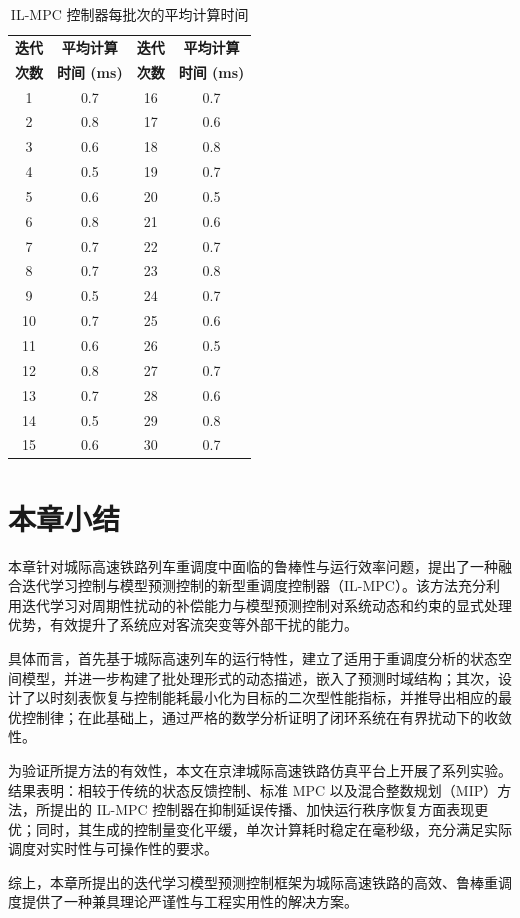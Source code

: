 \begin{table}
\centering
\caption{IL-MPC 控制器每批次的平均计算时间}
\begin{tabular}{@{}c@{\hspace{8pt}}c@{\hspace{12pt}}c@{\hspace{8pt}}c@{}}
\hline
\textbf{迭代} & \textbf{平均计算} & \textbf{迭代} & \textbf{平均计算} \\
\textbf{次数} & \textbf{时间 (ms)} & \textbf{次数} & \textbf{时间 (ms)} \\
\hline
1  & 0.7 & 16 & 0.7 \\
2  & 0.8 & 17 & 0.6 \\
3  & 0.6 & 18 & 0.8 \\
4  & 0.5 & 19 & 0.7 \\
5  & 0.6 & 20 & 0.5 \\
6  & 0.8 & 21 & 0.6 \\
7  & 0.7 & 22 & 0.7 \\
8  & 0.7 & 23 & 0.8 \\
9  & 0.5 & 24 & 0.7 \\
10 & 0.7 & 25 & 0.6 \\
11 & 0.6 & 26 & 0.5 \\
12 & 0.8 & 27 & 0.7 \\
13 & 0.7 & 28 & 0.6 \\
14 & 0.5 & 29 & 0.8 \\
15 & 0.6 & 30 & 0.7 \\
\hline
\end{tabular}
\label{computation time}
\end{table}

\section{本章小结}
\label{section6}

本章针对城际高速铁路列车重调度中面临的鲁棒性与运行效率问题，提出了一种融合迭代学习控制与模型预测控制的新型重调度控制器（IL-MPC）。该方法充分利用迭代学习对周期性扰动的补偿能力与模型预测控制对系统动态和约束的显式处理优势，有效提升了系统应对客流突变等外部干扰的能力。

具体而言，首先基于城际高速列车的运行特性，建立了适用于重调度分析的状态空间模型，并进一步构建了批处理形式的动态描述，嵌入了预测时域结构；其次，设计了以时刻表恢复与控制能耗最小化为目标的二次型性能指标，并推导出相应的最优控制律；在此基础上，通过严格的数学分析证明了闭环系统在有界扰动下的收敛性。

为验证所提方法的有效性，本文在京津城际高速铁路仿真平台上开展了系列实验。结果表明：相较于传统的状态反馈控制、标准 MPC 以及混合整数规划（MIP）方法，所提出的 IL-MPC 控制器在抑制延误传播、加快运行秩序恢复方面表现更优；同时，其生成的控制量变化平缓，单次计算耗时稳定在毫秒级，充分满足实际调度对实时性与可操作性的要求。

综上，本章所提出的迭代学习模型预测控制框架为城际高速铁路的高效、鲁棒重调度提供了一种兼具理论严谨性与工程实用性的解决方案。

